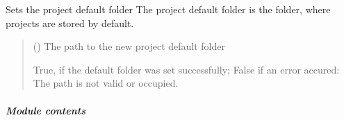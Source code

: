 \documentclass[letterpaper,10pt,english]{sphinxmanual}
\begin{document}
\begin{fulllineitems}
\begin{fulllineitems}
\begin{quote}
\begin{description}
\sphinxAtStartPar
{}

\end{description}\end{quote}

\end{fulllineitems}


\begin{fulllineitems}
\label{\detokenize{apidoc/src.osm_configurator.control:src.osm_configurator.control.settings_controller.SettingsController.set_project_default_folder}}
\pysigstartsignatures
{}
\pysigstopsignatures
\sphinxAtStartPar
Sets the project default folder
The project default folder is the folder, where projects are stored by default.
\begin{quote}\begin{description}
\sphinxAtStartPar
{} () \textendash{} The path to the new project default folder

\sphinxAtStartPar
True, if the default folder was set successfully; False if an error accured: The path is not valid or occupied.

\sphinxAtStartPar
{}

\end{description}\end{quote}

\end{fulllineitems}


\end{fulllineitems}



\subparagraph{Module contents}
\label{\detokenize{apidoc/src.osm_configurator.control:module-src.osm_configurator.control}}\label{\detokenize{apidoc/src.osm_configurator.control:module-contents}}
\sphinxstepscope
\end{document}

